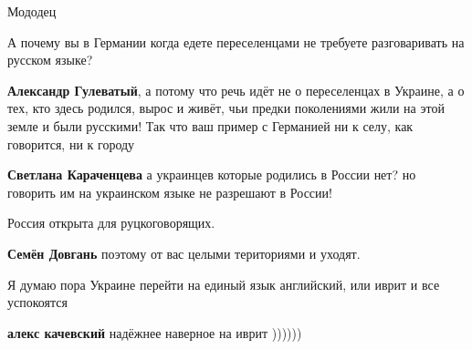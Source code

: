 \begin{itemize}

Мододец


А почему вы в Германии когда едете переселенцами не требуете разговаривать на русском языке?

\begin{itemize}

\textbf{Александр Гулеватый}, а потому что речь идёт не о переселенцах в
Украине, а о тех, кто здесь родился, вырос и живёт, чьи предки
поколениями жили на этой земле и были русскими! Так что ваш
пример с Германией ни к селу, как говорится, ни к городу


\textbf{Светлана Караченцева} а украинцев которые родились в России нет? но
говорить им на украинском языке не разрешают в России!
\end{itemize}


Россия открыта для руцкоговорящих.

\begin{itemize}

\textbf{Семён Довгань} поэтому от вас целыми териториями и уходят.
\end{itemize}


Я думаю пора Украине перейти на единый язык английский, или иврит и все успокоятся🤣

\begin{itemize}

\textbf{алекс качевский} надёжнее наверное на иврит ))))))



\end{itemize}
\end{itemize}
